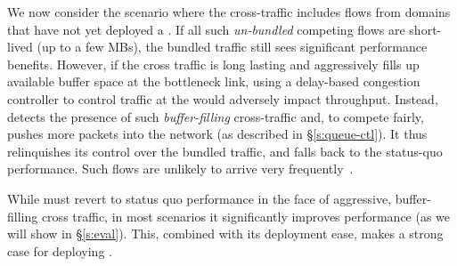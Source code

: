  We now consider the scenario where the cross-traffic includes flows from domains that have not yet deployed a \name. If all such \emph{un-bundled} competing flows are short-lived (up to a few MBs), the bundled traffic still sees significant performance benefits. 
However, if the cross traffic is long lasting and aggressively fills up available buffer space at the bottleneck link, using a delay-based congestion controller to control traffic at the \name would adversely impact throughput. Instead, \name detects the presence of such \emph{buffer-filling} cross-traffic and, to compete fairly, pushes more packets into the network (as described in \S\ref{s:queue-ctl}). It thus relinquishes its control over the bundled traffic, and falls back to the status-quo performance.
Such flows are unlikely to arrive very frequently~\cite{caida-dataset}. 

\vspace{0.05in}
 While \name must revert to status quo performance in the face of aggressive, buffer-filling cross traffic, in most scenarios it significantly improves performance (as we will show in \S\ref{s:eval}).
This, combined with its deployment ease, makes a strong case for deploying \name. 
